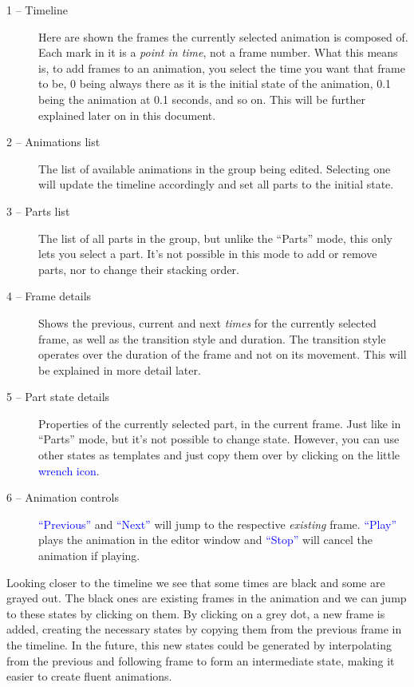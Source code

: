 \documentclass[a4paper]{profusion}
\newcommand{\GUIIcon}[1]{\textcolor{blue}{#1}}    %
\begin{document}
\begin{description}
\item[1 -- Timeline] Here are shown the frames the currently selected
  animation is composed of. Each mark in it is a \emph{point in time},
  not a frame number. What this means is, to add frames to an
  animation, you select the time you want that frame to be, 0 being
  always there as it is the initial state of the animation, 0.1 being
  the animation at 0.1 seconds, and so on.  This will be further
  explained later on in this document.
\item[2 -- Animations list] The list of available animations in the
  group being edited. Selecting one will update the timeline
  accordingly and set all parts to the initial state.
\item[3 -- Parts list] The list of all parts in the group, but unlike
  the ``Parts'' mode, this only lets you select a part. It's not
  possible in this mode to add or remove parts, nor to change their
  stacking order.
\item[4 -- Frame details] Shows the previous, current and next
  \emph{times} for the currently selected frame, as well as the
  transition style and duration. The transition style operates over
  the duration of the frame and not on its movement. This will be
  explained in more detail later.
\item[5 -- Part state details] Properties of the currently selected
  part, in the current frame. Just like in ``Parts'' mode, but it's
  not possible to change state. However, you can use other states as
  templates and just copy them over by clicking on the little
  \GUIIcon{wrench icon}.
\item[6 -- Animation controls] \GUIIcon{``Previous''} and
  \GUIIcon{``Next''} will jump to the respective \emph{existing}
  frame. \GUIIcon{``Play''} plays the animation in the editor window
  and \GUIIcon{``Stop''} will cancel the animation if playing.
\end{description}

Looking closer to the timeline we see that some times are black and
some are grayed out. The black ones are existing frames in the
animation and we can jump to these states by clicking on them. By
clicking on a grey dot, a new frame is added, creating the necessary
states by copying them from the previous frame in the timeline. In the
future, this new states could be generated by interpolating from the
previous and following frame to form an intermediate state, making it
easier to create fluent animations.
\end{document}
